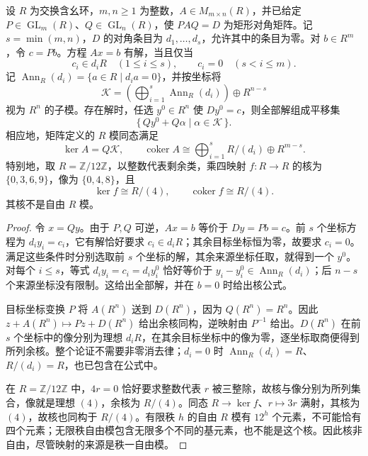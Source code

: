 \begin{proposition}\label{b2:prop:A-diagonal-annihilators}
	设 \(R\) 为交换含幺环，\(m,n\ge1\) 为整数，\(A\in M_{m\times n}(R)\)，并已给定 \(P\in\operatorname{GL}_m(R)\)、\(Q\in\operatorname{GL}_n(R)\)，使 \(PAQ=D\) 为矩形对角矩阵。记 \(s=\min(m,n)\)，\(D\) 的对角条目为 \(d_1,\ldots,d_s\)，允许其中的条目为零。对 \(b\in R^m\)，令 \(c=Pb\)。方程 \(Ax=b\) 有解，当且仅当
	\[
		c_i\in d_iR\quad(1\le i\le s),\qquad c_i=0\quad(s<i\le m).
	\]
	记 \(\operatorname{Ann}_R(d_i)=\{a\in R\mid d_ia=0\}\)，并按坐标将
	\[
		\mathcal K= \left(\bigoplus_{i=1}^s\operatorname{Ann}_R(d_i)\right) \oplus R^{n-s}
	\]
	视为 \(R^n\) 的子模。存在解时，任选 \(y^0\in R^n\) 使 \(Dy^0=c\)，则全部解组成平移集
	\[
		\{\,Qy^0+Q\alpha\mid\alpha\in\mathcal K\,\}.
	\]
	相应地，矩阵定义的 \(R\) 模同态满足
	\[
		\ker A=Q\mathcal K,\qquad \operatorname{coker}A\cong \bigoplus_{i=1}^s R/(d_i)\oplus R^{m-s}.
	\]
	特别地，取 \(R=\mathbb Z/12\mathbb Z\)，以整数代表剩余类，乘四映射 \(f:R\to R\) 的核为 \(\{0,3,6,9\}\)，像为 \(\{0,4,8\}\)，且
	\[
		\ker f\cong R/(4),\qquad \operatorname{coker}f\cong R/(4).
	\]
	其核不是自由 \(R\) 模。
\end{proposition}
\begin{proof}
	令 \(x=Qy\)。由于 \(P,Q\) 可逆，\(Ax=b\) 等价于 \(Dy=Pb=c\)。前 \(s\) 个坐标方程为 \(d_iy_i=c_i\)，它有解恰好要求 \(c_i\in d_iR\)；其余目标坐标恒为零，故要求 \(c_i=0\)。满足这些条件时分别选取前 \(s\) 个坐标的解，其余来源坐标任取，就得到一个 \(y^0\)。对每个 \(i\le s\)，等式 \(d_iy_i=c_i=d_iy_i^0\) 恰好等价于 \(y_i-y_i^0\in\operatorname{Ann}_R(d_i)\)；后 \(n-s\) 个来源坐标没有限制。这给出全部解，并在 \(b=0\) 时给出核公式。

	目标坐标变换 \(P\) 将 \(A(R^n)\) 送到 \(D(R^n)\)，因为 \(Q(R^n)=R^n\)。因此 \(z+A(R^n)\mapsto Pz+D(R^n)\) 给出余核同构，逆映射由 \(P^{-1}\) 给出。\(D(R^n)\) 在前 \(s\) 个坐标中的像分别为理想 \(d_iR\)，在其余目标坐标中的像为零，逐坐标取商便得到所列余核。整个论证不需要非零消去律；\(d_i=0\) 时 \(\operatorname{Ann}_R(d_i)=R\)、\(R/(d_i)=R\)，也已包含在公式中。

	在 \(R=\mathbb Z/12\mathbb Z\) 中，\(4r=0\) 恰好要求整数代表 \(r\) 被三整除，故核与像分别为所列集合，像就是理想 \((4)\)，余核为 \(R/(4)\)。同态 \(R\to\ker f\)、\(r\mapsto3r\) 满射，其核为 \((4)\)，故核也同构于 \(R/(4)\)。有限秩 \(h\) 的自由 \(R\) 模有 \(12^h\) 个元素，不可能恰有四个元素；无限秩自由模包含无限多个不同的基元素，也不能是这个核。因此核非自由，尽管映射的来源是秩一自由模。
\end{proof}
